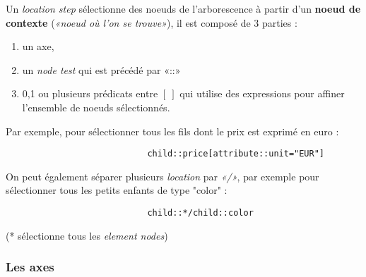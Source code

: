 \documentclass{article}
\begin{document}
Un \textit{location step} sélectionne des noeuds de l'arborescence à partir d'un \textbf{noeud de contexte} (\textit{«noeud où l'on se trouve»}), il est composé de 3 parties : 
\begin{enumerate}
\item un axe, 
\item un \textit{node test} qui est précédé par «::»
\item 0,1 ou plusieurs prédicats entre $[\ ]$ qui utilise des expressions pour affiner l'ensemble de noeuds sélectionnés.
\end{enumerate}
Par exemple, pour sélectionner tous les fils dont le prix est exprimé en euro : 
\begin{verbatim}
                            child::price[attribute::unit="EUR"]
\end{verbatim}
On peut également séparer plusieurs \textit{location} par \textit{«/»}, par exemple pour sélectionner tous les petits enfants de type "color" :
\begin{verbatim}
                            child::*/child::color
\end{verbatim}
(* sélectionne tous les \textit{element nodes}) 
\subsubsection{Les axes}
\end{document}
